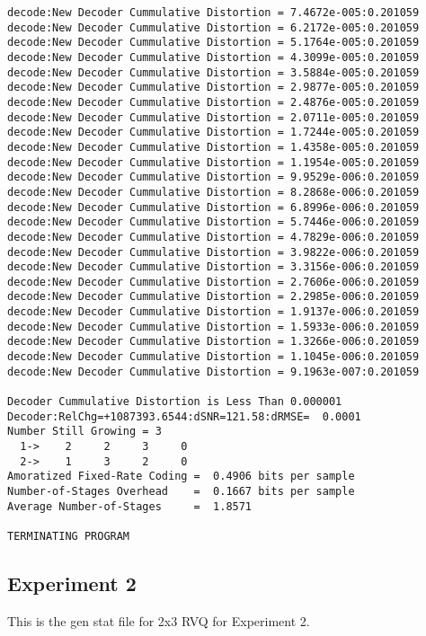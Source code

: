 \begin{verbatim}
decode:New Decoder Cummulative Distortion = 7.4672e-005:0.201059
decode:New Decoder Cummulative Distortion = 6.2172e-005:0.201059
decode:New Decoder Cummulative Distortion = 5.1764e-005:0.201059
decode:New Decoder Cummulative Distortion = 4.3099e-005:0.201059
decode:New Decoder Cummulative Distortion = 3.5884e-005:0.201059
decode:New Decoder Cummulative Distortion = 2.9877e-005:0.201059
decode:New Decoder Cummulative Distortion = 2.4876e-005:0.201059
decode:New Decoder Cummulative Distortion = 2.0711e-005:0.201059
decode:New Decoder Cummulative Distortion = 1.7244e-005:0.201059
decode:New Decoder Cummulative Distortion = 1.4358e-005:0.201059
decode:New Decoder Cummulative Distortion = 1.1954e-005:0.201059
decode:New Decoder Cummulative Distortion = 9.9529e-006:0.201059
decode:New Decoder Cummulative Distortion = 8.2868e-006:0.201059
decode:New Decoder Cummulative Distortion = 6.8996e-006:0.201059
decode:New Decoder Cummulative Distortion = 5.7446e-006:0.201059
decode:New Decoder Cummulative Distortion = 4.7829e-006:0.201059
decode:New Decoder Cummulative Distortion = 3.9822e-006:0.201059
decode:New Decoder Cummulative Distortion = 3.3156e-006:0.201059
decode:New Decoder Cummulative Distortion = 2.7606e-006:0.201059
decode:New Decoder Cummulative Distortion = 2.2985e-006:0.201059
decode:New Decoder Cummulative Distortion = 1.9137e-006:0.201059
decode:New Decoder Cummulative Distortion = 1.5933e-006:0.201059
decode:New Decoder Cummulative Distortion = 1.3266e-006:0.201059
decode:New Decoder Cummulative Distortion = 1.1045e-006:0.201059
decode:New Decoder Cummulative Distortion = 9.1963e-007:0.201059

Decoder Cummulative Distortion is Less Than 0.000001
Decoder:RelChg=+1087393.6544:dSNR=121.58:dRMSE=  0.0001
Number Still Growing = 3
  1->    2     2     3     0 
  2->    1     3     2     0 
Amoratized Fixed-Rate Coding =  0.4906 bits per sample
Number-of-Stages Overhead    =  0.1667 bits per sample
Average Number-of-Stages     =  1.8571

TERMINATING PROGRAM
\end{verbatim}
\normalsize

\clearpage
\newpage
\subsection{Experiment 2}
\label{Exp2_gen_stat}
This is the gen stat file for 2x3 RVQ for Experiment 2.

